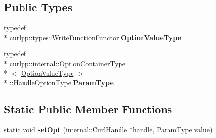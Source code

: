 \subsection*{Public Types}
\begin{DoxyCompactItemize}
\item 
\hypertarget{classcurlpp_1_1internal_1_1OptionSetter_3_01curlpp_1_1types_1_1WriteFunctionFunctor_00_01CURLOPT__WRITEFUNCTION_01_4_a2e5ec9a1a15d810384829e55f3e070fa}{typedef \\*
\hyperlink{classutilspp_1_1Functor}{curlpp\-::types\-::\-Write\-Function\-Functor} {\bfseries Option\-Value\-Type}}\label{classcurlpp_1_1internal_1_1OptionSetter_3_01curlpp_1_1types_1_1WriteFunctionFunctor_00_01CURLOPT__WRITEFUNCTION_01_4_a2e5ec9a1a15d810384829e55f3e070fa}

\item 
\hypertarget{classcurlpp_1_1internal_1_1OptionSetter_3_01curlpp_1_1types_1_1WriteFunctionFunctor_00_01CURLOPT__WRITEFUNCTION_01_4_a71b1261ea5d8161d8efe83c22a3a5701}{typedef \\*
\hyperlink{structcurlpp_1_1internal_1_1OptionContainerType}{curlpp\-::internal\-::\-Option\-Container\-Type}\\*
$<$ \hyperlink{classutilspp_1_1Functor}{Option\-Value\-Type} $>$\\*
\-::Handle\-Option\-Type {\bfseries Param\-Type}}\label{classcurlpp_1_1internal_1_1OptionSetter_3_01curlpp_1_1types_1_1WriteFunctionFunctor_00_01CURLOPT__WRITEFUNCTION_01_4_a71b1261ea5d8161d8efe83c22a3a5701}

\end{DoxyCompactItemize}
\subsection*{Static Public Member Functions}
\begin{DoxyCompactItemize}
\item 
\hypertarget{classcurlpp_1_1internal_1_1OptionSetter_3_01curlpp_1_1types_1_1WriteFunctionFunctor_00_01CURLOPT__WRITEFUNCTION_01_4_a92360b9013ae5629a1444a34a6ee48e8}{static void {\bfseries set\-Opt} (\hyperlink{classcurlpp_1_1internal_1_1CurlHandle}{internal\-::\-Curl\-Handle} $\ast$handle, Param\-Type value)}\label{classcurlpp_1_1internal_1_1OptionSetter_3_01curlpp_1_1types_1_1WriteFunctionFunctor_00_01CURLOPT__WRITEFUNCTION_01_4_a92360b9013ae5629a1444a34a6ee48e8}

\end{DoxyCompactItemize}


